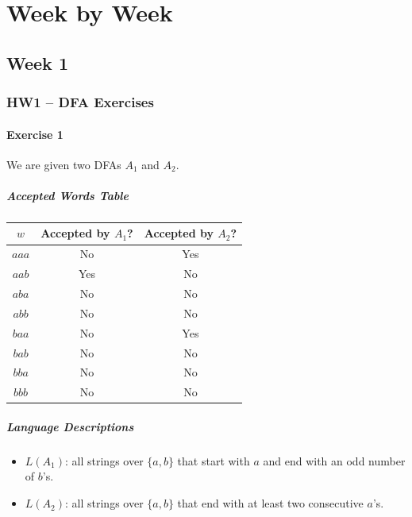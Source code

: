 \documentclass[11pt, a4paper]{article}
\theoremstyle{definition}
\theoremstyle{remark}
\begin{document}
\clearpage
\section{Week by Week}\label{homework}

\subsection{Week 1}
\subsubsection*{HW1 -- DFA Exercises}

\paragraph{Exercise 1}

We are given two DFAs $A_1$ and $A_2$.

\subparagraph{Accepted Words Table}

\begin{center}
\begin{tabular}{c|c|c}
$w$ & Accepted by $A_1$? & Accepted by $A_2$? \\ \hline
$aaa$ & No & Yes \\
$aab$ & Yes & No \\
$aba$ & No & No \\
$abb$ & No & No \\
$baa$ & No & Yes \\
$bab$ & No & No \\
$bba$ & No & No \\
$bbb$ & No & No \\
\end{tabular}
\end{center}

\subparagraph{Language Descriptions}

\begin{itemize}
\item $L(A_1)$: all strings over $\{a,b\}$ that start with $a$ and end with an odd number of $b$'s.
\item $L(A_2)$: all strings over $\{a,b\}$ that end with at least two consecutive $a$'s.
\end{itemize}

\vspace{1em}
\end{document}
